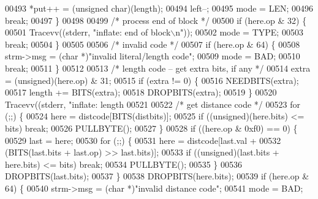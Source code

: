 \begin{DoxyCode}
{{{{{{{{{{00493                 *put++ = (\textcolor{keywordtype}{unsigned} char)(length);
00494                 left--;
00495                 mode = LEN;
00496                 \textcolor{keywordflow}{break};
00497             \}
00498 
00499             \textcolor{comment}{/* process end of block */}
00500             \textcolor{keywordflow}{if} (here.op & 32) \{
00501                 Tracevv((stderr, \textcolor{stringliteral}{"inflate:         end of block\(\backslash\)n"}));
00502                 mode = TYPE;
00503                 \textcolor{keywordflow}{break};
00504             \}
00505 
00506             \textcolor{comment}{/* invalid code */}
00507             \textcolor{keywordflow}{if} (here.op & 64) \{
00508                 strm->msg = (\textcolor{keywordtype}{char} *)\textcolor{stringliteral}{"invalid literal/length code"};
00509                 mode = BAD;
00510                 \textcolor{keywordflow}{break};
00511             \}
00512 
00513             \textcolor{comment}{/* length code -- get extra bits, if any */}
00514             extra = (unsigned)(here.op) & 31;
00515             \textcolor{keywordflow}{if} (extra != 0) \{
00516                 NEEDBITS(extra);
00517                 length += BITS(extra);
00518                 DROPBITS(extra);
00519             \}
00520             Tracevv((stderr, \textcolor{stringliteral}{"inflate:         length %
00521 
00522             \textcolor{comment}{/* get distance code */}
00523             \textcolor{keywordflow}{for} (;;) \{
00524                 here = distcode[BITS(distbits)];
00525                 \textcolor{keywordflow}{if} ((\textcolor{keywordtype}{unsigned})(here.bits) <= bits) \textcolor{keywordflow}{break};
00526                 PULLBYTE();
00527             \}
00528             \textcolor{keywordflow}{if} ((here.op & 0xf0) == 0) \{
00529                 last = here;
00530                 \textcolor{keywordflow}{for} (;;) \{
00531                     here = distcode[last.val +
00532                             (BITS(last.bits + last.op) >> last.bits)];
00533                     \textcolor{keywordflow}{if} ((\textcolor{keywordtype}{unsigned})(last.bits + here.bits) <= bits) \textcolor{keywordflow}{break};
00534                     PULLBYTE();
00535                 \}
00536                 DROPBITS(last.bits);
00537             \}
00538             DROPBITS(here.bits);
00539             \textcolor{keywordflow}{if} (here.op & 64) \{
00540                 strm->msg = (\textcolor{keywordtype}{char} *)\textcolor{stringliteral}{"invalid distance code"};
00541                 mode = BAD;
}}}}}}}}}}}
\end{DoxyCode}
